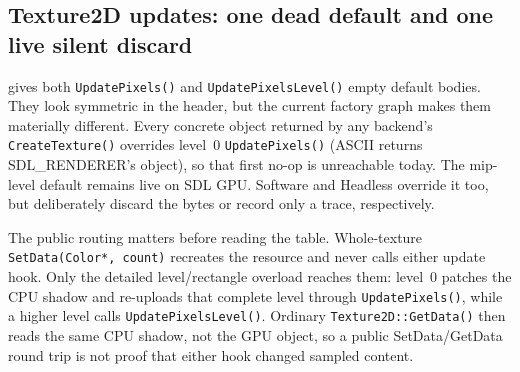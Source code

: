 \subsection{Texture2D updates: one dead default and one live silent discard}
\label{sec:texture2d-update-matrix}

 gives both \texttt{UpdatePixels()} and
\texttt{UpdatePixelsLevel()} empty default bodies. They look symmetric in the header, but
the current factory graph makes them materially different. Every concrete object returned by
any backend's \texttt{CreateTexture()} overrides level~0 \texttt{UpdatePixels()} (ASCII
returns SDL\_RENDERER's object), so that first no-op is unreachable today. The mip-level
default remains live on SDL GPU. Software and Headless override it too, but deliberately
discard the bytes or record only a trace, respectively.

The public routing matters before reading the table. Whole-texture
\texttt{SetData(Color*, count)} recreates the resource and never calls either update hook.
Only the detailed level/rectangle overload reaches them: level~0 patches the CPU shadow and
re-uploads that complete level through \texttt{UpdatePixels()}, while a higher level calls
\texttt{UpdatePixelsLevel()}. Ordinary \texttt{Texture2D::GetData()} then reads the same CPU
shadow, not the GPU object, so a public SetData/GetData round trip is not proof that either
hook changed sampled content.

